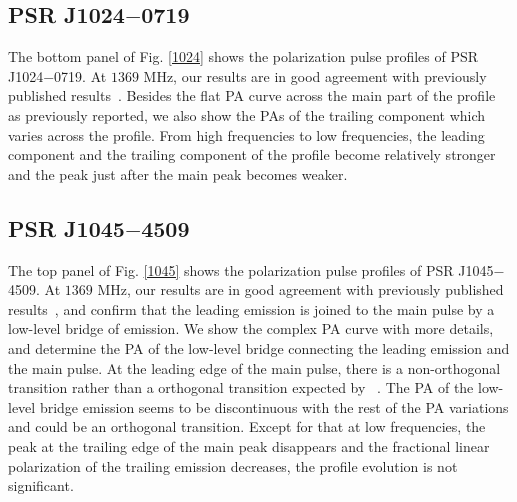 \documentclass[useAMS,usenatbib]{mn2e}
\begin{document}
\begin{appendices}
%
\subsection{PSR J1024$-$0719}

The bottom panel of Fig. \ref{1024} shows the polarization pulse profiles of 
PSR J1024$-$0719.
%
At $1369$ MHz, our results are in good agreement with previously published
results~\citep{Ord04,Yan11}. 
%
Besides the flat PA curve across the main part of the profile as 
previously reported, we also show the PAs of the trailing component which 
varies across the profile.
%
From high frequencies to low frequencies, the leading component and the 
trailing component of the profile become relatively stronger and the peak 
just after the main peak becomes weaker.



%
\subsection{PSR J1045$-$4509}

The top panel of Fig. \ref{1045} shows the polarization pulse profiles of 
PSR J1045$-$4509.
%
At $1369$ MHz, our results are in good agreement with previously published
results~\citep{Yan11}, and confirm that the leading emission is joined to 
the main pulse by a low-level bridge of emission.
%
We show the complex PA curve with more details, and determine the PA of the 
low-level bridge connecting the leading emission and the main pulse.
%
At the leading edge of the main pulse, there is a non-orthogonal transition 
rather than a orthogonal transition expected by ~\citet{Yan11}.
%
The PA of the low-level bridge emission seems to be discontinuous with 
the rest of the PA variations and could be an orthogonal transition.
%
Except for that at low frequencies, the peak at the trailing edge of the 
main peak disappears and the fractional linear polarization of the trailing 
emission decreases, the profile evolution is not significant.


\end{appendices}
\end{document}
